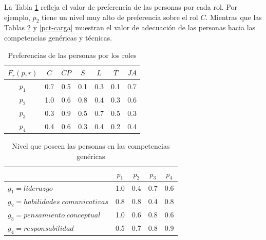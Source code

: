 %
La Tabla \ref{pr-carga} refleja el valor de preferencia de las personas por cada rol. Por ejemplo, $p_2$  tiene un nivel muy alto de preferencia sobre el rol  $C$. Mientras que las Tablas \ref{pcg-carga} y \ref{pct-carga} muestran el valor de adecuación de las personas hacia las competencias genéricas y técnicas.

\begin{table}[H]
	\centering
	\caption{Preferencias de las personas por los roles}\label{pr-carga}
	\begin{tabular}{|c|c|c|c|c|c|c|}
		\hline
		$F_r(p,r)$  & $C$ & $CP$ & $S$ & $L$ & $T$  & $JA$ \\ \hline
		$p_1$   	& 0.7 &  0.5 & 0.1 & 0.3 &  0.1 &  0.7 \\ \hline
		$p_2$   	& 1.0 &  0.6 & 0.8 & 0.4 &  0.3 &  0.6  \\ \hline
		$p_3$  	 	& 0.3 &  0.9 & 0.5 & 0.7 &  0.5 &  0.3  \\ \hline
		$p_4$    	& 0.4 &  0.6 & 0.3 & 0.4 &  0.2 &  0.4  \\ \hline
	\end{tabular}
\end{table}

\begin{table}[H]
	\centering
	\caption{Nivel que poseen las personas en las competencias genéricas}\label{pcg-carga}
	\begin{tabular}{|l|c|c|c|c|}
		\hline
		\thead{$F_g(p,g)$} & $p_1$ & $p_2$ & $p_3$ & $p_4$ \\ \hline
		$g_1=liderazgo$  	   &  1.0  &  0.4  &  0.7 & 0.6 \\ \hline
		$g_2=habilidades\;comunicativas$      &  0.8  &  0.8  &  0.4 & 0.8 \\ \hline
		$g_3=pensamiento\;conceptual$  	   &  1.0  &  0.6  &  0.8 & 0.6 \\ \hline
		$g_4=responsabilidad$  	   &  0.5  &  0.7  &  0.8 & 0.9 \\ \hline
	\end{tabular}
\end{table}
	
